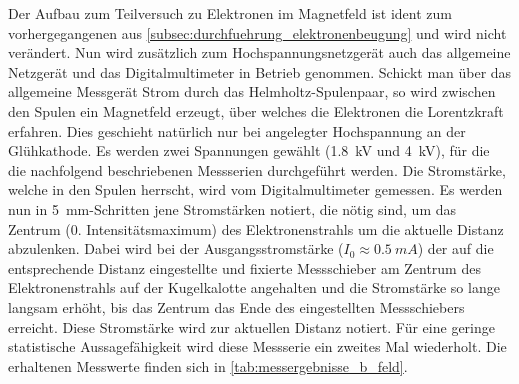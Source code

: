 \documentclass[ngerman]{scrartcl}
\begin{document}
Der Aufbau zum Teilversuch zu Elektronen im Magnetfeld ist ident zum vorhergegangenen aus \autoref{subsec:durchfuehrung_elektronenbeugung} und wird nicht verändert. Nun wird zusätzlich zum Hochspannungsnetzgerät auch das allgemeine Netzgerät und das Digitalmultimeter in Betrieb genommen. Schickt man über das allgemeine Messgerät Strom %
durch das Helmholtz-Spulenpaar, so wird zwischen den Spulen ein Magnetfeld erzeugt, über welches die Elektronen die Lorentzkraft erfahren. Dies geschieht natürlich nur bei angelegter Hochspannung an der Glühkathode. Es werden zwei Spannungen gewählt (\SI{1.8}{kV} und \SI{4}{kV}), für die die nachfolgend beschriebenen Messserien durchgeführt werden. Die Stromstärke, welche in den Spulen herrscht, wird vom Digitalmultimeter gemessen. Es werden nun in \SI{5}{mm}-Schritten jene Stromstärken notiert, die nötig sind, um das Zentrum (0. Intensitätsmaximum) des Elektronenstrahls um die aktuelle Distanz abzulenken. Dabei wird bei der Ausgangsstromstärke ($I_0 \approx \SI{0.5}{mA}$) der auf die entsprechende Distanz eingestellte und fixierte Messschieber am Zentrum des Elektronenstrahls auf der Kugelkalotte angehalten und die Stromstärke so lange langsam erhöht, bis das Zentrum das Ende des eingestellten Messschiebers erreicht. Diese Stromstärke wird zur aktuellen Distanz notiert. Für eine geringe statistische Aussagefähigkeit wird diese Messserie ein zweites Mal wiederholt. Die erhaltenen Messwerte finden sich in \autoref{tab:messergebnisse_b_feld}.
%
\end{document}
